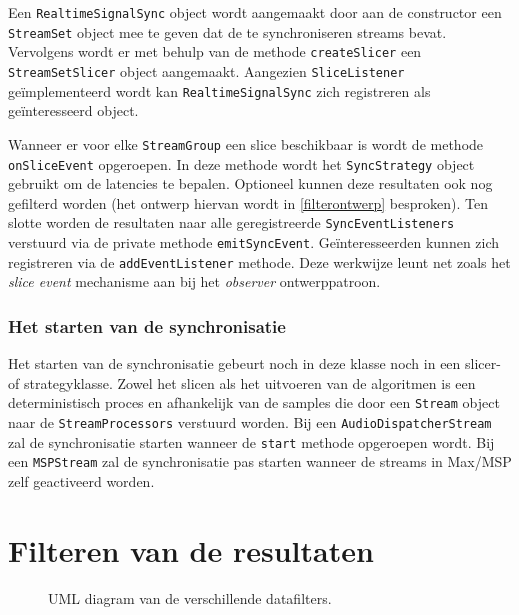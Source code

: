 Een \texttt{RealtimeSignalSync} object wordt aangemaakt door aan de constructor een \texttt{StreamSet} object mee te geven dat de te synchroniseren streams bevat. Vervolgens wordt er met behulp van de methode \texttt{createSlicer} een \texttt{StreamSetSlicer} object aangemaakt. Aangezien \texttt{SliceListener} geïmplementeerd wordt kan \texttt{RealtimeSignalSync} zich registreren als geïnteresseerd object.

Wanneer er voor elke \texttt{StreamGroup} een slice beschikbaar is wordt de methode \texttt{onSliceEvent} opgeroepen. In deze methode wordt het \texttt{SyncStrategy} object gebruikt om de latencies te bepalen. Optioneel kunnen deze resultaten ook nog gefilterd worden (het ontwerp hiervan wordt in \ref{filterontwerp} besproken). Ten slotte worden de resultaten naar alle geregistreerde \texttt{SyncEventListeners} verstuurd via de private methode \texttt{emitSyncEvent}. Geïnteresseerden kunnen zich registreren via de \texttt{addEventListener} methode. Deze werkwijze leunt net zoals het \textit{slice event} mechanisme aan bij het \textit{observer} ontwerppatroon.

\subsubsection{Het starten van de synchronisatie}

Het starten van de synchronisatie gebeurt noch in deze klasse noch in een slicer- of \mbox{strategyklasse}. Zowel het slicen als het uitvoeren van de algoritmen is een deterministisch proces en afhankelijk van de samples die door een \texttt{Stream} object naar de \texttt{StreamProcessors} verstuurd worden. Bij een \texttt{AudioDispatcherStream} zal de synchronisatie starten wanneer de \texttt{start} methode opgeroepen wordt. Bij een \texttt{MSPStream} zal de synchronisatie pas starten wanneer de streams in Max/MSP zelf geactiveerd worden.

\section*{Filteren van de resultaten}
\label{filterontwerp}

\begin{figure}[h!]
	\captionsetup{width=0.7\textwidth}
	\caption{UML diagram van de verschillende datafilters.}
	\begin{center}
		\advance\parskip0.3cm
		
	\end{center}
	\label{filterUML}
\end{figure}

